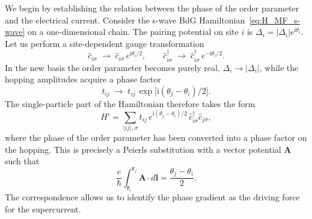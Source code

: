 \documentclass[11pt,a4paper,twoside,openany]{report}
\begin{document}
We begin by establishing the relation between the phase of the order parameter and
the electrical current.  Consider the s-wave BdG Hamiltonian~\eqref{eq:H_MF_s-wave}
on a one-dimensional chain.  The pairing potential on site $i$ is
$\Delta_i = |\Delta_i| e^{\mathrm{i}\theta_i}$.  Let us perform a site-dependent gauge
transformation
\begin{equation}
  \hat{c}_{i\sigma} \;\longrightarrow\; \hat{c}_{i\sigma}\, e^{\mathrm{i}\theta_i/2}, \qquad
  \hat{c}_{i\sigma}^{\dagger} \;\longrightarrow\; \hat{c}_{i\sigma}^{\dagger}\, e^{-\mathrm{i}\theta_i/2}.
\end{equation}
In the new basis the order parameter becomes purely real, $\Delta_i \to |\Delta_i|$,
while the hopping amplitudes acquire a phase factor
\begin{equation}
  t_{ij} \;\longrightarrow\; t_{ij}\, \exp\!\bigl[\mathrm{i}(\theta_j - \theta_i)/2\bigr].
\end{equation}
The single-particle part of the Hamiltonian therefore takes the form
\begin{equation}
  H' = \sum_{\langle ij\rangle,\sigma}
       t_{ij}\, e^{\mathrm{i}(\theta_j-\theta_i)/2}\,\hat{c}_{i\sigma}^{\dagger}\hat{c}_{j\sigma},
  \label{eq:Peierls}
\end{equation}
where the phase of the order parameter has been converted into a phase factor on the
hopping.  This is precisely a Peierls substitution with a vector potential $\mathbf{A}$ such that
\begin{equation}
  \frac{e}{\hbar}\int_{\mathbf{r}_i}^{\mathbf{r}_j} \mathbf{A}\cdot d\mathbf{l}
  = \frac{\theta_j-\theta_i}{2}.
\end{equation}
The correspondence allows us to identify the phase gradient as the driving force for
the supercurrent.
\end{document}

